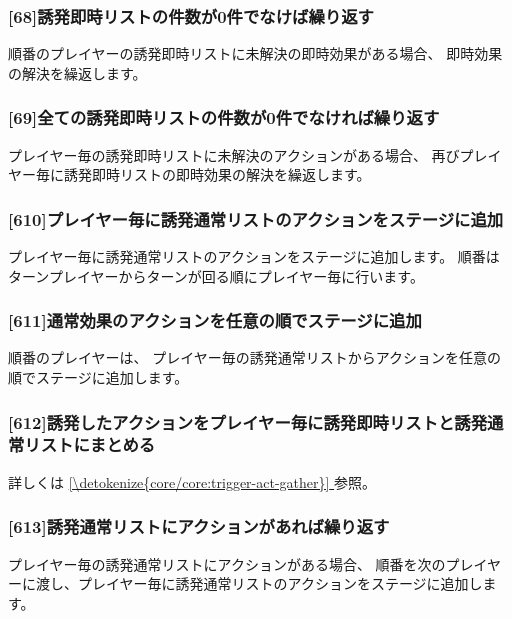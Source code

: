 \documentclass[letterpaper,10pt,dvipdfmx]{sphinxmanual}
\begin{document}
\subsubsection{{[}6\sphinxhyphen{}8{]}誘発即時リストの件数が0件でなけば繰り返す}
\label{\detokenize{core/core:id37}}
\sphinxAtStartPar
順番のプレイヤーの誘発即時リストに未解決の即時効果がある場合、
即時効果の解決を繰返します。


\subsubsection{{[}6\sphinxhyphen{}9{]}全ての誘発即時リストの件数が0件でなければ繰り返す}
\label{\detokenize{core/core:id38}}
\sphinxAtStartPar
プレイヤー毎の誘発即時リストに未解決のアクションがある場合、
再びプレイヤー毎に誘発即時リストの即時効果の解決を繰返します。


\subsubsection{{[}6\sphinxhyphen{}10{]}プレイヤー毎に誘発通常リストのアクションをステージに追加}
\label{\detokenize{core/core:id39}}
\sphinxAtStartPar
プレイヤー毎に誘発通常リストのアクションをステージに追加します。
順番はターンプレイヤーからターンが回る順にプレイヤー毎に行います。


\subsubsection{{[}6\sphinxhyphen{}11{]}通常効果のアクションを任意の順でステージに追加}
\label{\detokenize{core/core:id40}}
\sphinxAtStartPar
順番のプレイヤーは、 プレイヤー毎の誘発通常リストからアクションを任意の順でステージに追加します。


\subsubsection{{[}6\sphinxhyphen{}12{]}誘発したアクションをプレイヤー毎に誘発即時リストと誘発通常リストにまとめる}
\label{\detokenize{core/core:id41}}
\sphinxAtStartPar
詳しくは \hyperref[\detokenize{core/core:trigger-act-gather}]{\ref{\detokenize{core/core:trigger-act-gather}} } 参照。


\subsubsection{{[}6\sphinxhyphen{}13{]}誘発通常リストにアクションがあれば繰り返す}
\label{\detokenize{core/core:id42}}
\sphinxAtStartPar
プレイヤー毎の誘発通常リストにアクションがある場合、
順番を次のプレイヤーに渡し、プレイヤー毎に誘発通常リストのアクションをステージに追加します。
\end{document}
